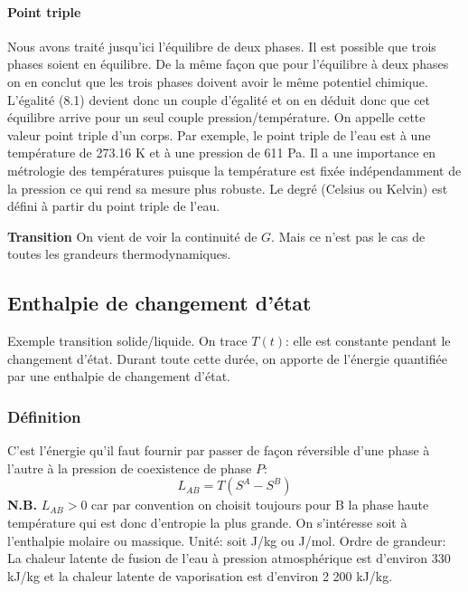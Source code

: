 \documentclass[11pt]{report}
\numberwithin{figure}{section}
\numberwithin{equation}{section}
\numberwithin{table}{section}
\newcommand{\1}{\boldsymbol{1}}
\begin{document}
\paragraph{Point triple}  

Nous avons traité jusqu’ici l’équilibre de deux phases. Il est possible que trois
phases soient en équilibre. De la même façon que pour l’équilibre à deux phases
on en conclut que les trois phases doivent avoir le même potentiel chimique.
L’égalité (8.1) devient donc un couple d’égalité et on en déduit donc que cet
équilibre arrive pour un seul couple pression/température. On appelle cette
valeur point triple d’un corps. Par exemple, le point triple de l’eau est à une température de 273.16 K et à une pression de 611 Pa. Il a une importance en
métrologie des températures puisque la température est fixée indépendamment
de la pression ce qui rend sa mesure plus robuste. Le degré (Celsius ou Kelvin)
est défini à partir du point triple de l’eau.



\textbf{Transition} On vient de voir la continuité de $G$. Mais ce n'est pas le cas de toutes les grandeurs thermodynamiques.

\subsection{Enthalpie de changement d'état}

Exemple transition solide/liquide. On trace $T(t)$: elle est constante pendant le changement d'état. Durant toute cette durée, on apporte de l'énergie quantifiée par une enthalpie de changement d'état.

\subsubsection{Définition} C'est l'énergie qu’il faut fournir par passer de façon réversible d’une phase à l’autre à la pression de coexistence de phase $P$:
\begin{equation}
L_{AB} = T (S^A - S^B) 
\end{equation}
\textbf{N.B.} $L_{AB} > 0$ car par convention on choisit toujours pour B la phase haute température qui est donc d’entropie la plus grande. On s'intéresse soit à l'enthalpie molaire ou massique. Unité: soit J/kg ou J/mol. Ordre de grandeur: La chaleur latente de fusion de l’eau à pression atmosphérique est d’environ 330 kJ/kg et la chaleur
latente de vaporisation est d’environ 2 200 kJ/kg.
\end{document}
